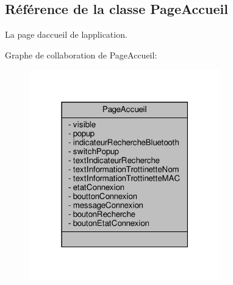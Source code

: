 \hypertarget{class_page_accueil}{}\subsection{Référence de la classe Page\+Accueil}
\label{class_page_accueil}


La page d\textquotesingle{}accueil de l\textquotesingle{}application.  




Graphe de collaboration de Page\+Accueil\+:\nopagebreak
\begin{figure}[H]
\begin{center}
\leavevmode
\includegraphics[width=235pt]{class_page_accueil__coll__graph}
\end{center}
\end{figure}
